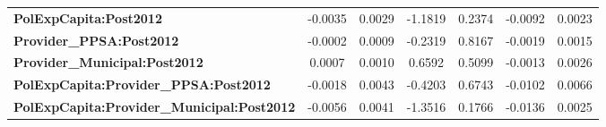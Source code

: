 \begin{center}
\begin{tabular}{lcccccc}
\textbf{PolExpCapita:Post2012}                     &      -0.0035       &       0.0029       &     -1.1819     &      0.2374      &      -0.0092      &       0.0023       \\
\textbf{Provider\_PPSA:Post2012}                   &      -0.0002       &       0.0009       &     -0.2319     &      0.8167      &      -0.0019      &       0.0015       \\
\textbf{Provider\_Municipal:Post2012}              &       0.0007       &       0.0010       &      0.6592     &      0.5099      &      -0.0013      &       0.0026       \\
\textbf{PolExpCapita:Provider\_PPSA:Post2012}      &      -0.0018       &       0.0043       &     -0.4203     &      0.6743      &      -0.0102      &       0.0066       \\
\textbf{PolExpCapita:Provider\_Municipal:Post2012} &      -0.0056       &       0.0041       &     -1.3516     &      0.1766      &      -0.0136      &       0.0025       \\
\bottomrule
\end{tabular}
\end{center}